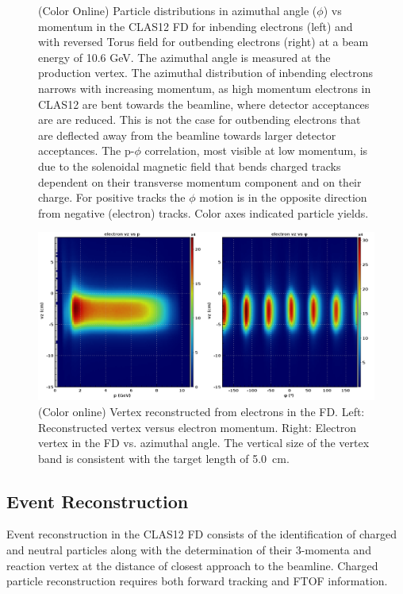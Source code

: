 \documentclass[final,3p,twocolumn]{elsarticle}
\begin{document}
\begin{figure}[h!]
\caption{(Color Online) Particle distributions in azimuthal angle ($\phi$) vs momentum in the CLAS12 FD for inbending electrons  (left) and with reversed Torus field for outbending electrons (right) at a beam energy of 10.6 GeV.  The azimuthal angle is measured at the production vertex. The azimuthal distribution of inbending electrons 
 narrows with increasing momentum, as high momentum electrons in CLAS12 are bent towards the beamline, where detector acceptances are are reduced. This is not the case for outbending electrons that are deflected away from the beamline 
 towards larger detector acceptances. The p-$\phi$ correlation, most visible at low momentum, is due to
  the solenoidal magnetic field that bends charged tracks dependent on their transverse momentum component
  and on their charge. For positive tracks the $\phi$ motion is in the opposite direction from negative (electron) tracks. 
  Color axes indicated particle yields.} 
\label{neg-pos}
\end{figure}
\begin{figure}[t!]
\centerline{\includegraphics[width=1.8\columnwidth]{e_vz.png}}
\caption{(Color online) Vertex reconstructed from electrons in the FD. Left: Reconstructed vertex versus electron momentum. 
Right: Electron vertex in the FD vs. azimuthal angle. The vertical size of the vertex band is consistent with the target length of 5.0~cm. } 
\label{vertex}
\end{figure}



\subsection{Event Reconstruction} 

Event reconstruction in the CLAS12 FD consists of the identification of charged and neutral particles along with the 
determination of their 3-momenta and reaction vertex at the distance of closest approach to the beamline.
Charged particle reconstruction requires both forward tracking and FTOF information. 
\end{document}
